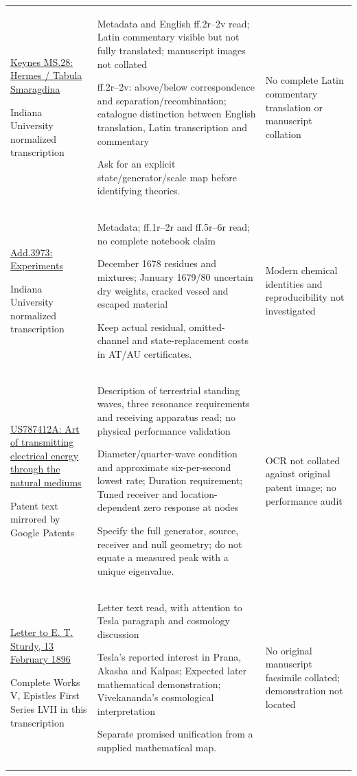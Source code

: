 \begin{longtable}{@{}p{43mm}p{65mm}p{44mm}@{}}
\href{https://newton.dlib.indiana.edu/text/ALCH00017/normalized}{Keynes MS.28: Hermes / Tabula Smaragdina}\par Indiana University normalized transcription & Metadata and English ff.2r--2v read; Latin commentary visible but not fully translated; manuscript images not collated\par ff.2r--2v: above/below correspondence and separation/recombination; catalogue distinction between English translation, Latin transcription and commentary\par Ask for an explicit state/generator/scale map before identifying theories. & No complete Latin commentary translation or manuscript collation\\\addlinespace
\href{https://newton.dlib.indiana.edu/text/ALCH00109/normalized}{Add.3973: Experiments}\par Indiana University normalized transcription & Metadata; ff.1r--2r and ff.5r--6r read; no complete notebook claim\par December 1678 residues and mixtures; January 1679/80 uncertain dry weights, cracked vessel and escaped material\par Keep actual residual, omitted-channel and state-replacement costs in AT/AU certificates. & Modern chemical identities and reproducibility not investigated\\\addlinespace
\href{https://patents.google.com/patent/US787412A/en}{US787412A: Art of transmitting electrical energy through the natural mediums}\par Patent text mirrored by Google Patents & Description of terrestrial standing waves, three resonance requirements and receiving apparatus read; no physical performance validation\par Diameter/quarter-wave condition and approximate six-per-second lowest rate; Duration requirement; Tuned receiver and location-dependent zero response at nodes\par Specify the full generator, source, receiver and null geometry; do not equate a measured peak with a unique eigenvalue. & OCR not collated against original patent image; no performance audit\\\addlinespace
\href{https://www.ramakrishnavivekananda.info/vivekananda/volume_5/epistles_first_series/057_blessed_and_beloved.htm}{Letter to E. T. Sturdy, 13 February 1896}\par Complete Works V, Epistles First Series LVII in this transcription & Letter text read, with attention to Tesla paragraph and cosmology discussion\par Tesla's reported interest in Prana, Akasha and Kalpas; Expected later mathematical demonstration; Vivekananda's cosmological interpretation\par Separate promised unification from a supplied mathematical map. & No original manuscript facsimile collated; demonstration not located\\\addlinespace

\end{longtable}
